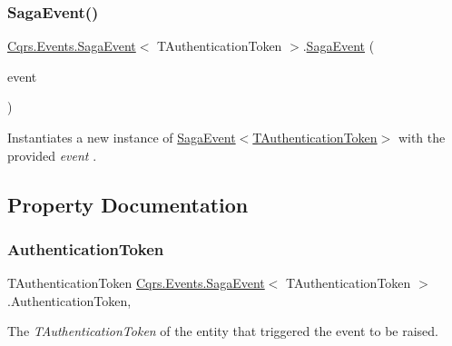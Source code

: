 \subsubsection{\texorpdfstring{Saga\+Event()}{SagaEvent()}\hspace{0.1cm}{\footnotesize\ttfamily [2/2]}}
{\footnotesize\ttfamily \hyperlink{classCqrs_1_1Events_1_1SagaEvent}{Cqrs.\+Events.\+Saga\+Event}$<$ T\+Authentication\+Token $>$.\hyperlink{classCqrs_1_1Events_1_1SagaEvent}{Saga\+Event} (\begin{DoxyParamCaption}\item[{\hyperlink{interfaceCqrs_1_1Events_1_1IEvent}{I\+Event}$<$ T\+Authentication\+Token $>$ @}]{event }\end{DoxyParamCaption})}



Instantiates a new instance of \hyperlink{classCqrs_1_1Events_1_1SagaEvent_a658ce04baccb816bf132702cccaa6a90_a658ce04baccb816bf132702cccaa6a90}{Saga\+Event$<$\+T\+Authentication\+Token$>$} with the provided {\itshape event} . 



\subsection{Property Documentation}
\mbox{\label{classCqrs_1_1Events_1_1SagaEvent_a9b5abd2cc59f97f53eaa2c2277733e7f_a9b5abd2cc59f97f53eaa2c2277733e7f}} 
\subsubsection{\texorpdfstring{Authentication\+Token}{AuthenticationToken}}
{\footnotesize\ttfamily T\+Authentication\+Token \hyperlink{classCqrs_1_1Events_1_1SagaEvent}{Cqrs.\+Events.\+Saga\+Event}$<$ T\+Authentication\+Token $>$.Authentication\+Token\hspace{0.3cm}{\ttfamily [get]}, {\ttfamily [set]}}



The {\itshape T\+Authentication\+Token}  of the entity that triggered the event to be raised. 

\mbox{\label{classCqrs_1_1Events_1_1SagaEvent_a3bd1014469c88b763173da28a7d5023c_a3bd1014469c88b763173da28a7d5023c}} 
